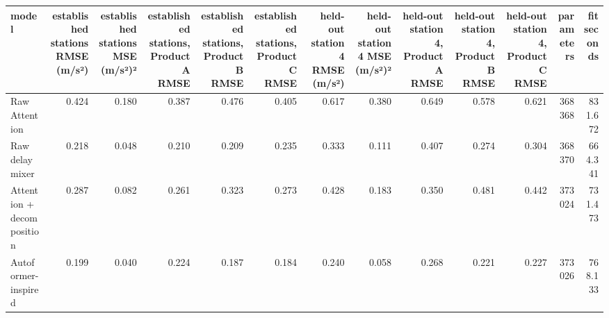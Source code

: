 \begin{tabular}{lrrrrrrrrrrrr}
\toprule
model & established stations RMSE (m/s²) & established stations MSE (m/s²)² & established stations, Product A RMSE & established stations, Product B RMSE & established stations, Product C RMSE & held-out station 4 RMSE (m/s²) & held-out station 4 MSE (m/s²)² & held-out station 4, Product A RMSE & held-out station 4, Product B RMSE & held-out station 4, Product C RMSE & parameters & fit seconds \\
\midrule
Raw Attention & 0.424 & 0.180 & 0.387 & 0.476 & 0.405 & 0.617 & 0.380 & 0.649 & 0.578 & 0.621 & 368368 & 831.672 \\
Raw delay mixer & 0.218 & 0.048 & 0.210 & 0.209 & 0.235 & 0.333 & 0.111 & 0.407 & 0.274 & 0.304 & 368370 & 664.341 \\
Attention + decomposition & 0.287 & 0.082 & 0.261 & 0.323 & 0.273 & 0.428 & 0.183 & 0.350 & 0.481 & 0.442 & 373024 & 731.473 \\
Autoformer-inspired & 0.199 & 0.040 & 0.224 & 0.187 & 0.184 & 0.240 & 0.058 & 0.268 & 0.221 & 0.227 & 373026 & 768.133 \\
\bottomrule
\end{tabular}

